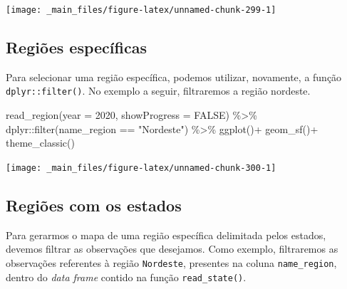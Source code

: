 \documentclass[
  brazilian,
]{book}
\newenvironment{Shaded}{\begin{snugshade}}{\end{snugshade}}
\newcommand{\AttributeTok}[1]{\textcolor[rgb]{0.77,0.63,0.00}{#1}}
\newcommand{\ConstantTok}[1]{\textcolor[rgb]{0.00,0.00,0.00}{#1}}
\newcommand{\DecValTok}[1]{\textcolor[rgb]{0.00,0.00,0.81}{#1}}
\newcommand{\FunctionTok}[1]{\textcolor[rgb]{0.00,0.00,0.00}{#1}}
\newcommand{\NormalTok}[1]{#1}
\newcommand{\SpecialCharTok}[1]{\textcolor[rgb]{0.00,0.00,0.00}{#1}}
\newcommand{\StringTok}[1]{\textcolor[rgb]{0.31,0.60,0.02}{#1}}
\begin{document}
\begin{center}\texttt{[image: \_main\_files/figure-latex/unnamed-chunk-299-1]} \end{center}

\hypertarget{regiuxf5es-especuxedficas}{%
\subsection{Regiões específicas}\label{regiuxf5es-especuxedficas}}

Para selecionar uma região específica, podemos utilizar, novamente, a função \texttt{dplyr::filter()}. No exemplo a seguir, filtraremos a região nordeste.

\begin{Shaded}
\begin{Highlighting}[]
\FunctionTok{read\_region}\NormalTok{(}\AttributeTok{year =} \DecValTok{2020}\NormalTok{,}
            \AttributeTok{showProgress =} \ConstantTok{FALSE}\NormalTok{) }\SpecialCharTok{\%\textgreater{}\%} 
\NormalTok{  dplyr}\SpecialCharTok{::}\FunctionTok{filter}\NormalTok{(name\_region }\SpecialCharTok{==} \StringTok{"Nordeste"}\NormalTok{) }\SpecialCharTok{\%\textgreater{}\%} 
  \FunctionTok{ggplot}\NormalTok{()}\SpecialCharTok{+}
  \FunctionTok{geom\_sf}\NormalTok{()}\SpecialCharTok{+}
  \FunctionTok{theme\_classic}\NormalTok{()}
\end{Highlighting}
\end{Shaded}

\begin{center}\texttt{[image: \_main\_files/figure-latex/unnamed-chunk-300-1]} \end{center}

\hypertarget{regiuxf5es-com-os-estados}{%
\subsection{Regiões com os estados}\label{regiuxf5es-com-os-estados}}

Para gerarmos o mapa de uma região específica delimitada pelos estados, devemos filtrar as observações que desejamos. Como exemplo, filtraremos as observações referentes à região \texttt{Nordeste}, presentes na coluna \texttt{name\_region}, dentro do \emph{data frame} contido na função \texttt{read\_state()}.
\end{document}
